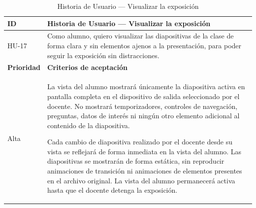 \documentclass[11pt]{article}
\newcommand{\ttstyle}{%
  \small
  \setlength{\tabcolsep}{6pt}%
  \renewcommand{\arraystretch}{1.25}%
  \arrayrulecolor{azulprofundo}%
}
\newcommand{\hairrule}{%
  \arrayrulecolor{azulregla}\midrule[0.3pt]\arrayrulecolor{azulprofundo}%
}
\begin{document}
\begin{table}[H]
    \centering
    \renewcommand{\arraystretch}{1.2}
    \ttstyle
    \begin{tabular}{p{2.5cm}p{11cm}}
        \toprule
        \textbf{ID} & \textbf{Historia de Usuario --- Visualizar la exposición} \\
        \midrule
        HU-17 & Como alumno, quiero visualizar las diapositivas de la clase de forma clara y sin elementos ajenos a la presentación, para poder seguir la exposición sin distracciones. \\
        \hairrule
        \textbf{Prioridad} & \textbf{Criterios de aceptación} \\
        \hairrule
        Alta & La vista del alumno mostrará únicamente la diapositiva activa en pantalla completa en el dispositivo de salida seleccionado por el docente. No mostrará temporizadores, controles de navegación, preguntas, datos de interés ni ningún otro elemento adicional al contenido de la diapositiva.

        Cada cambio de diapositiva realizado por el docente desde su vista se reflejará de forma inmediata en la vista del alumno. Las diapositivas se mostrarán de forma estática, sin reproducir animaciones de transición ni animaciones de elementos presentes en el archivo original. La vista del alumno permanecerá activa hasta que el docente detenga la exposición. \\
        \bottomrule
    \end{tabular}
    \caption{Historia de Usuario --- Visualizar la exposición}
    \label{tab:hu-visualizar-exposicion}
\end{table}
\end{document}
